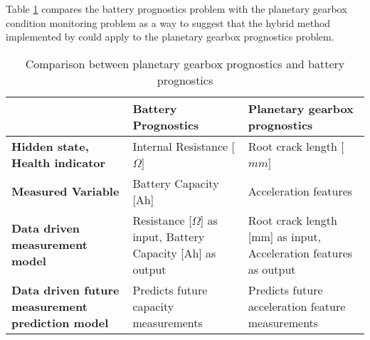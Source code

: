


Table \ref{t:Compare} compares the battery prognostics problem with the planetary gearbox condition monitoring problem as a way to suggest that the hybrid method implemented by \cite{Liao2016} could apply to the planetary gearbox prognostics problem.




\begin{table}[H]
	\centering
	\caption{Comparison between planetary gearbox prognostics and battery prognostics}
	\label{t:Compare}
	\begin{tabular}{|p{4cm}|p{6cm}|p{6cm}|}
		\hline
		&\textbf{Battery Prognostics}  & \textbf{Planetary gearbox prognostics} \\ \hline
		\textbf{Hidden state, Health indicator} & Internal Resistance [$\Omega$] & Root crack length [$mm$] \\\hline
		\textbf{Measured Variable} & Battery Capacity [Ah] & Acceleration features \\\hline
		\textbf{Data driven measurement model} & Resistance [$\Omega$] as input, Battery Capacity [Ah] as output & Root crack length [mm] as input, Acceleration features as output \\\hline
		\textbf{Data driven future measurement prediction model} & Predicts future capacity measurements & Predicts future acceleration feature measurements \\ \hline
	\end{tabular}
\end{table}




